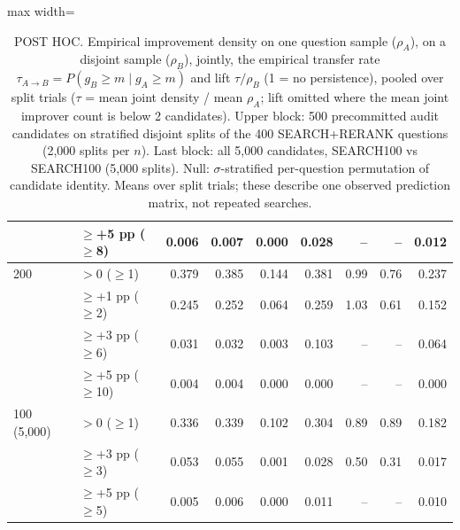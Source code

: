 \begin{table}[t]
\begin{adjustbox}{max width=\linewidth}
\begin{tabular}{llrrrrrrr}
 & $\ge$+5 pp ($\ge$8) & 0.006 & 0.007 & 0.000 & 0.028 & -- & -- & 0.012 \\
\midrule
200 & $>0$ ($\ge$1) & 0.379 & 0.385 & 0.144 & 0.381 & 0.99 & 0.76 & 0.237 \\
 & $\ge$+1 pp ($\ge$2) & 0.245 & 0.252 & 0.064 & 0.259 & 1.03 & 0.61 & 0.152 \\
 & $\ge$+3 pp ($\ge$6) & 0.031 & 0.032 & 0.003 & 0.103 & -- & -- & 0.064 \\
 & $\ge$+5 pp ($\ge$10) & 0.004 & 0.004 & 0.000 & 0.000 & -- & -- & 0.000 \\
\midrule
100 (5,000) & $>0$ ($\ge$1) & 0.336 & 0.339 & 0.102 & 0.304 & 0.89 & 0.89 & 0.182 \\
 & $\ge$+3 pp ($\ge$3) & 0.053 & 0.055 & 0.001 & 0.028 & 0.50 & 0.31 & 0.017 \\
 & $\ge$+5 pp ($\ge$5) & 0.005 & 0.006 & 0.000 & 0.011 & -- & -- & 0.010 \\
\bottomrule
\end{tabular}
\end{adjustbox}
\caption{POST HOC. Empirical improvement density on one question sample ($\rho_A$), on a disjoint sample ($\rho_B$), jointly, the empirical transfer rate $\tau_{A\to B}=P(g_B\ge m\mid g_A\ge m)$ and lift $\tau/\rho_B$ (1 = no persistence), pooled over split trials ($\tau$ = mean joint density / mean $\rho_A$; lift omitted where the mean joint improver count is below 2 candidates). Upper block: 500 precommitted audit candidates on stratified disjoint splits of the 400 SEARCH+RERANK questions (2,000 splits per $n$). Last block: all 5,000 candidates, SEARCH100 vs SEARCH100 (5,000 splits). Null: $\sigma$-stratified per-question permutation of candidate identity. Means over split trials; these describe one observed prediction matrix, not repeated searches.}
\label{tab:transfer-density}
\end{table}

